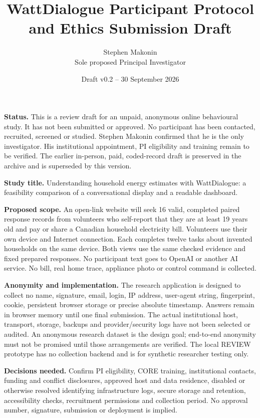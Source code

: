 \documentclass[11pt,letterpaper]{article}
\title{WattDialogue Participant Protocol and Ethics Submission Draft}
\author{Stephen Makonin\\Sole proposed Principal Investigator}
\date{Draft v0.2 -- 30 September 2026}
\begin{document}
\maketitle
\thispagestyle{fancy}

\textbf{Status.} This is a review draft for an unpaid, anonymous online behavioural study. It has not been submitted or approved. No participant has been contacted, recruited, screened or studied. Stephen Makonin confirmed that he is the only investigator. His institutional appointment, PI eligibility and training remain to be verified. The earlier in-person, paid, coded-record draft is preserved in the archive and is superseded by this version.

\textbf{Study title.} Understanding household energy estimates with WattDialogue: a feasibility comparison of a conversational display and a readable dashboard.

\textbf{Proposed scope.} An open-link website will seek 16 valid, completed paired response records from volunteers who self-report that they are at least 19 years old and pay or share a Canadian household electricity bill. Volunteers use their own device and Internet connection. Each completes twelve tasks about invented households on the same device. Both views use the same checked evidence and fixed prepared responses. No participant text goes to OpenAI or another AI service. No bill, real home trace, appliance photo or control command is collected.

\textbf{Anonymity and implementation.} The research application is designed to collect no name, signature, email, login, IP address, user-agent string, fingerprint, cookie, persistent browser storage or precise absolute timestamp. Answers remain in browser memory until one final submission. The actual institutional host, transport, storage, backups and provider/security logs have not been selected or audited. An anonymous research dataset is the design goal; end-to-end anonymity must not be promised until those arrangements are verified. The local REVIEW prototype has no collection backend and is for synthetic researcher testing only.

\textbf{Decisions needed.} Confirm PI eligibility, CORE training, institutional contacts, funding and conflict disclosures, approved host and data residence, disabled or otherwise resolved identifying infrastructure logs, secure storage and retention, accessibility checks, recruitment permissions and collection period. No approval number, signature, submission or deployment is implied.
\end{document}
